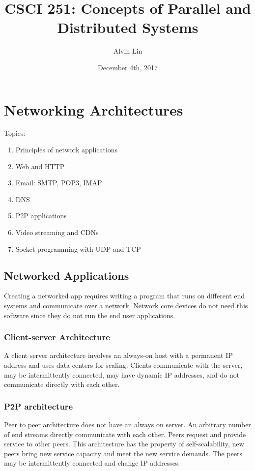 \documentclass{math}
\title{CSCI 251: Concepts of Parallel and Distributed Systems}
\author{Alvin Lin}
\date{December 4th, 2017}
\begin{document}
\maketitle

\section*{Networking Architectures}
Topics:
\begin{enumerate}
  \item Principles of network applications
  \item Web and HTTP
  \item Email: SMTP, POP3, IMAP
  \item DNS
  \item P2P applications
  \item Video streaming and CDNs
  \item Socket programming with UDP and TCP
\end{enumerate}

\subsection*{Networked Applications}
Creating a networked app requires writing a program that runs on different end
systems and communicate over a network. Network core devices do not need this
software since they do not run the end user applications.

\subsubsection*{Client-server Architecture}
A client server architecture involves an always-on host with a permanent IP
address and uses data centers for scaling. Clients communicate with the server,
may be intermittently connected, may have dynamic IP addresses, and do not
communicate directly with each other.

\subsubsection*{P2P architecture}
Peer to peer architecture does not have an always on server. An arbitrary number
of end streams directly communicate with each other. Peers request and provide
service to other peers. This architecture has the property of self-scalability,
new peers bring new service capacity and meet the new service demands. The peers
may be intermittently connected and change IP addresses.
\end{document}
